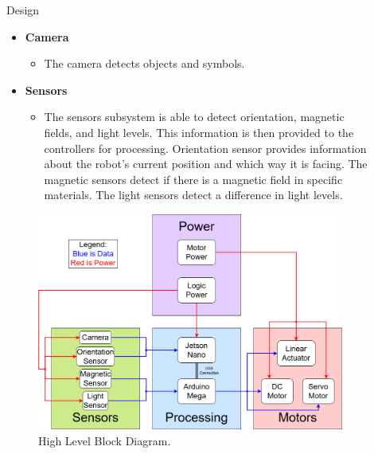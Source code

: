 \documentclass[final]{beamer}
\newlength{\sepwidth}
\newlength{\colwidth}
\newcommand{\separatorcolumn}{\begin{column}{\sepwidth}\end{column}}
\begin{document}
\begin{frame}[t]
\begin{columns}[t]
\begin{column}{\colwidth}
\begin{block}{Design}
\begin{itemize}
      \item \textbf{Camera}
        \begin{itemize}
          \item The camera detects objects and symbols.
        \end{itemize}
      
      \item \textbf{Sensors}
        \begin{itemize}
          \item The sensors subsystem is able to detect orientation, magnetic fields, and light levels. This information is then provided to the controllers for processing. Orientation sensor provides information about the robot's current position and which way it is facing. The magnetic sensors detect if there is a magnetic field in specific materials. The light sensors detect a difference in light levels.
        \end{itemize}
    
    \end{itemize}

    \begin{figure}
      \centering
      \includegraphics[width=20.0cm]{High_Block_Diagram.png}
      \caption{High Level Block Diagram.}
    \end{figure}
  
  \end{block}

\end{column}

\separatorcolumn

\begin{column}{\colwidth}


\end{column}
\end{columns}
\end{frame}
\end{document}
